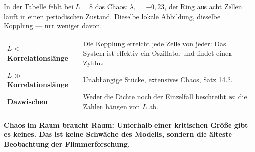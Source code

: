 \begin{warnung}
In der Tabelle fehlt bei $L = 8$ das Chaos: $\lambda_1 = -0{,}23$, der Ring aus acht Zellen läuft in einen periodischen Zustand. Dieselbe lokale Abbildung, dieselbe Kopplung --- nur weniger davon.

\begin{center}
{\small
\renewcommand{\arraystretch}{1.5}
\begin{tabular}{@{}P{2.8cm}P{6.0cm}@{}}
\toprule
\textbf{$L < $ Korrelationslänge} & Die Kopplung erreicht jede Zelle von jeder: Das System ist effektiv ein Oszillator und findet einen Zyklus.\\
\textbf{$L \gg$ Korrelationslänge} & Unabhängige Stücke, extensives Chaos, Satz 14.3.\\
\textbf{Dazwischen} & Weder die Dichte noch der Einzelfall beschreibt es; die Zahlen hängen von $L$ ab.\\
\bottomrule
\end{tabular}}
\end{center}

\begin{center}
\begin{minipage}{0.9\textwidth}
\textbf{Chaos im Raum braucht Raum: Unterhalb einer kritischen Größe gibt es keines. Das ist keine Schwäche des Modells, sondern die älteste Beobachtung der Flimmerforschung.}
\end{minipage}
\end{center}

\begin{center}
\begin{minipage}{0.88\textwidth}
\end{minipage}
\end{center}
\end{warnung}

